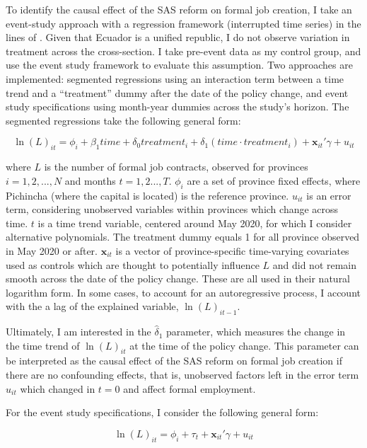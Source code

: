 \documentclass[11pt,a4paper]{article}\usepackage[]{graphicx}\usepackage[]{xcolor}
\begin{document}
To identify the causal effect of the SAS reform on formal job creation, I take an event-study approach with a regression framework (interrupted time series) in the lines of \textcite{Taljaard.2014}. Given that Ecuador is a unified republic, I do not observe variation in treatment across the cross-section. I take pre-event data as my control group, and use the event study framework to evaluate this assumption. Two approaches are implemented: segmented regressions using an interaction term between a time trend and a ``treatment'' dummy after the date of the policy change, and event study specifications using month-year dummies across the study's horizon. The segmented regressions take the following general form:

\begin{equation}
\label{eqn:seg}
\ln(L)_{it} = \phi_i + \beta_1 time + \delta_0 treatment_{i} + \delta_1(time \cdot treatment_{i}) + \mathbf{x}_{it}'\gamma + u_{it}
\end{equation}

where $L$ is the number of formal job contracts, observed for provinces $i = 1, 2, ..., N$ and months $t = 1,2 ..., T$. $\phi_i$ are a set of province fixed effects, where Pichincha (where the capital is located) is the reference province. $u_{it}$ is an error term, considering unobserved variables within provinces which change across time. $t$ is a time trend variable, centered around May 2020, for which I consider alternative polynomials. The treatment dummy equals 1 for all province observed in May 2020 or after. $\mathbf{x}_{it}$ is a vector of province-specific time-varying covariates used as controls which are thought to potentially influence $L$ and did not remain smooth across the date of the policy change. These are all used in their natural logarithm form. In some cases, to account for an autoregressive process, I account with the a lag of the explained variable, $\ln(L)_{it-1}$.

Ultimately, I am interested in the $\hat{\delta}_1$ parameter, which measures the change in the time trend of $\ln(L)_{it}$ at the time of the policy change. This parameter can be interpreted as the causal effect of the SAS reform on formal job creation if there are no confounding effects, that is, unobserved factors left in the error term $u_{it}$ which changed in $t = 0$ and affect formal employment.

For the event study specifications, I consider the following general form:

\begin{equation}
\label{eqn:event}
\ln(L)_{it} = \phi_i + \tau_t + \mathbf{x}_{it}'\gamma + u_{it}
\end{equation}
\end{document}
